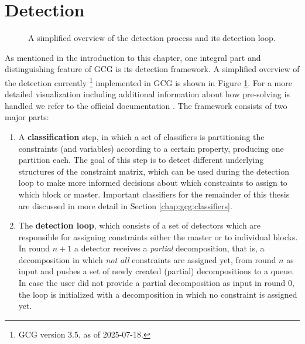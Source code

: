 	\section{Detection}
	
		\begin{figure}[ht!]
			\centering
			
			\caption{A simplified overview of the detection process and its detection loop.}
			\label{fig:gcg:detectionloop}
		\end{figure}
	
		As mentioned in the introduction to this chapter, one integral part and distinguishing feature of \ac{GCG} is its detection framework.
		A simplified overview of the detection currently \footnote{\ac{GCG} version 3.5, as of 2025-07-18.} implemented in \ac{GCG} is shown in Figure \ref{fig:gcg:detectionloop}. For a more detailed visualization including additional information about how pre-solving is handled we refer to the official documentation \cite{GCG}.
		The framework consists of two major parts:
		
		\begin{enumerate}
			\item A \textbf{classification} step, in which a set of classifiers is partitioning the constraints (and variables) according to a certain property, producing one partition each.
			The goal of this step is to detect different underlying structures of the constraint matrix, which can be used during the detection loop to make more informed decisions about which constraints to assign to which block or master.
			Important classifiers for the remainder of this thesis are discussed in more detail in Section \ref{chap:gcg:classifiers}.
			\item The \textbf{detection loop}, which consists of a set of detectors which are responsible for assigning constraints either the master or to individual blocks.
			In round $n+1$ a detector receives a \textit{partial} decomposition, that is, a decomposition in which \textit{not all} constraints are assigned yet, from round $n$ as input and pushes a set of newly created (partial) decompositions to a queue.
			In case the user did not provide a partial decomposition as input in round $0$, the loop is initialized with a decomposition in which no constraint is assigned yet.
		\end{enumerate}
	
